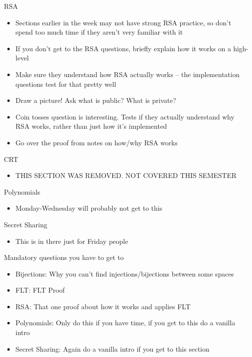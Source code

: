 \documentclass{exam}
\begin{document}
\begin{questions}
\item RSA
\begin{itemize}
\item Sections earlier in the week may not have strong RSA practice, so don’t spend too much time if they aren’t very familiar with it
\item If you don’t get to the RSA questions, briefly explain how it works on a high-level
\item Make sure they understand how RSA actually works – the implementation questions test for that pretty well
\item Draw a picture! Ask what is public? What is private?
\item Coin tosses question is interesting. Tests if they actually understand why RSA works, rather than just how it’s implemented
\item Go over the proof from notes on how/why RSA works
\end{itemize}

\item CRT
\begin{itemize}
\item THIS SECTION WAS REMOVED. NOT COVERED THIS SEMESTER
\end{itemize}

\item Polynomials
\begin{itemize}
\item Monday-Wednesday will probably not get to this
\end{itemize}

\item Secret Sharing
\begin{itemize}
\item This is in there just for Friday people
\end{itemize}
\item Mandatory questions you have to get to
\begin{itemize}
\item Bijections:  Why you can’t find injections/bijections between some spaces
\item FLT: FLT Proof
\item RSA: That one proof about how it works and applies FLT
\item Polynomials: Only do this if you have time, if you get to this do a vanilla intro
\item Secret Sharing: Again do a vanilla intro if you get to this section
\end{itemize}

\end{questions}
\end{document}
